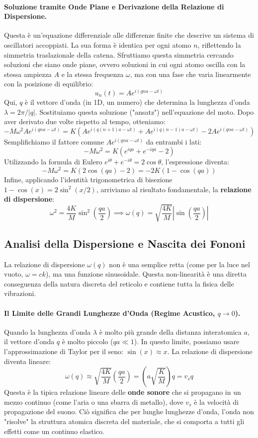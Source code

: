 \paragraph{Soluzione tramite Onde Piane e Derivazione della Relazione di Dispersione.}
Questa è un'equazione differenziale alle differenze finite che descrive un sistema di oscillatori accoppiati. La sua forma è identica per ogni atomo \(n\), riflettendo la simmetria traslazionale della catena. Sfruttiamo questa simmetria cercando soluzioni che siano onde piane, ovvero soluzioni in cui ogni atomo oscilla con la stessa ampiezza \(A\) e la stessa frequenza \(\omega\), ma con una fase che varia linearmente con la posizione di equilibrio:
\[ u_n(t) = A e^{i(qna - \omega t)} \]
Qui, \(q\) è il vettore d'onda (in 1D, un numero) che determina la lunghezza d'onda \(\lambda = 2\pi/|q|\). Sostituiamo questa soluzione ("ansatz") nell'equazione del moto. Dopo aver derivato due volte rispetto al tempo, otteniamo:
\[ -M\omega^2 A e^{i(qna - \omega t)} = K \left( A e^{i(q(n+1)a - \omega t)} + A e^{i(q(n-1)a - \omega t)} - 2 A e^{i(qna - \omega t)} \right) \]
Semplifichiamo il fattore comune \(A e^{i(qna - \omega t)}\) da entrambi i lati:
\[ -M\omega^2 = K (e^{iqa} + e^{-iqa} - 2) \]
Utilizzando la formula di Eulero \(e^{i\theta} + e^{-i\theta} = 2\cos\theta\), l'espressione diventa:
\[ -M\omega^2 = K(2\cos(qa) - 2) = -2K(1 - \cos(qa)) \]
Infine, applicando l'identità trigonometrica di bisezione \(1 - \cos(x) = 2\sin^2(x/2)\), arriviamo al risultato fondamentale, la \textbf{relazione di dispersione}:
\[ \omega^2 = \frac{4K}{M} \sin^2\left(\frac{qa}{2}\right) \implies \omega(q) = \sqrt{\frac{4K}{M}} \left| \sin\left(\frac{qa}{2}\right) \right| \]

\subsection{Analisi della Dispersione e Nascita dei Fononi}
La relazione di dispersione \(\omega(q)\) non è una semplice retta (come per la luce nel vuoto, \(\omega = ck\)), ma una funzione sinusoidale. Questa non-linearità è una diretta conseguenza della natura discreta del reticolo e contiene tutta la fisica delle vibrazioni.

\paragraph{Il Limite delle Grandi Lunghezze d'Onda (Regime Acustico, \(q \to 0\)).}
Quando la lunghezza d'onda \(\lambda\) è molto più grande della distanza interatomica \(a\), il vettore d'onda \(q\) è molto piccolo (\(qa \ll 1\)). In questo limite, possiamo usare l'approssimazione di Taylor per il seno: \(\sin(x) \approx x\). La relazione di dispersione diventa lineare:
\[ \omega(q) \approx \sqrt{\frac{4K}{M}} \left( \frac{qa}{2} \right) = \left( a\sqrt{\frac{K}{M}} \right) q = v_s q \]
Questa è la tipica relazione lineare delle \textbf{onde sonore} che si propagano in un mezzo continuo (come l'aria o una sbarra di metallo), dove \(v_s\) è la velocità di propagazione del suono. Ciò significa che per lunghe lunghezze d'onda, l'onda non "risolve" la struttura atomica discreta del materiale, che si comporta a tutti gli effetti come un continuo elastico.

